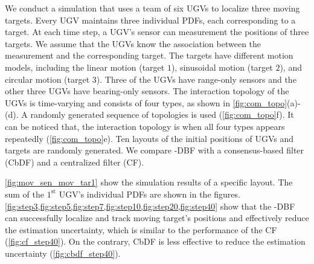 	We conduct a simulation that uses a team of six UGVs to localize three moving targets.
	Every UGV maintains three individual PDFs, each corresponding to a target.
	At each time step, a UGV's sensor can measurement the positions of three targets.
	We assume that the UGVs know the association between the measurement and the corresponding target.
	The targets have different motion models, including the linear motion (target $1$), sinusoidal motion (target $2$), and circular motion (target $3$).
	Three of the UGVs have range-only sensors and the other three UGVs have bearing-only sensors.
	The interaction topology of the UGVs is time-varying and consists of four types, as shown in \cref{fig:com_topo}(a)-(d).
	A randomly generated sequence of topologies is used (\cref{fig:com_topo}f).
	It can be noticed that, the interaction topology is \fc when all four types appears repeatedly (\cref{fig:com_topo}e).
	Ten layouts of the initial positions of UGVs and targets are randomly generated.
	We compare \proto-DBF with a consensus-based filter (CbDF) and a centralized filter (CF).
	
	\cref{fig:mov_sen_mov_tar1} show the simulation results of a specific layout.
	The sum of the $1^\text{st}$ UGV's individual PDFs are shown in the figures.
	\cref{fig:step3,fig:step5,fig:step7,fig:step10,fig:step20,fig:step40} show that the \proto-DBF can successfully localize and track moving target's positions and effectively reduce the estimation uncertainty, which is similar to the performance of the CF (\cref{fig:cf_step40}).
	On the contrary, CbDF is less effective to reduce the estimation uncertainty (\cref{fig:cbdf_step40}).
	
